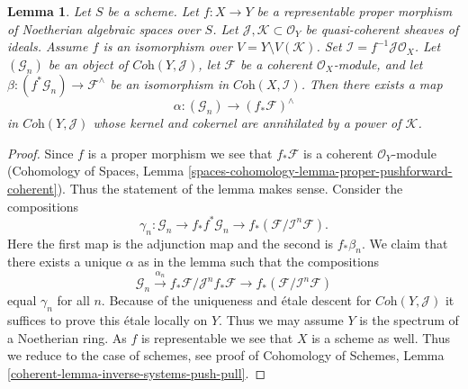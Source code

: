 \documentclass[10pt,a4paper]{amsart}
\theoremstyle{plain}
\newtheorem{lemma}[subsection]{Lemma}
\theoremstyle{definition}
\theoremstyle{remark}
\numberwithin{equation}{subsection}
\begin{document}
\begin{lemma}
\label{lemma-inverse-systems-push-pull}
Let $S$ be a scheme. Let $f : X \to Y$ be a representable
proper morphism of Noetherian algebraic spaces over $S$. Let
$\mathcal{J}, \mathcal{K} \subset \mathcal{O}_Y$
be quasi-coherent sheaves of ideals.
Assume $f$ is an isomorphism over $V = Y \setminus V(\mathcal{K})$.
Set $\mathcal{I} = f^{-1}\mathcal{J} \mathcal{O}_X$.
Let $(\mathcal{G}_n)$ be an object of $\textit{Coh}(Y, \mathcal{J})$,
let $\mathcal{F}$ be a coherent $\mathcal{O}_X$-module, and let
$\beta : (f^*\mathcal{G}_n)  \to \mathcal{F}^\wedge$ be an isomorphism in
$\textit{Coh}(X, \mathcal{I})$. Then there exists a map
$$
\alpha :
(\mathcal{G}_n)
\longrightarrow
(f_*\mathcal{F})^\wedge
$$
in $\textit{Coh}(Y, \mathcal{J})$ whose kernel and cokernel
are annihilated by a power of $\mathcal{K}$.
\end{lemma}

\begin{proof}
Since $f$ is a proper morphism we see that $f_*\mathcal{F}$ is a coherent
$\mathcal{O}_Y$-module (Cohomology of Spaces, Lemma
\ref{spaces-cohomology-lemma-proper-pushforward-coherent}).
Thus the statement of the lemma makes sense. Consider the compositions
$$
\gamma_n : \mathcal{G}_n \to
f_*f^*\mathcal{G}_n \to
f_*(\mathcal{F}/\mathcal{I}^n\mathcal{F}).
$$
Here the first map is the adjunction map and the second is $f_*\beta_n$.
We claim that there exists a unique $\alpha$ as in the lemma
such that the compositions
$$
\mathcal{G}_n \xrightarrow{\alpha_n}
f_*\mathcal{F}/\mathcal{J}^nf_*\mathcal{F} \to
f_*(\mathcal{F}/\mathcal{I}^n\mathcal{F})
$$
equal $\gamma_n$ for all $n$. Because of the uniqueness and \'etale
descent for $\textit{Coh}(Y, \mathcal{J})$ it suffices
to prove this \'etale locally on $Y$. Thus we may assume $Y$
is the spectrum of a Noetherian ring. As $f$ is representable
we see that $X$ is a scheme as well. Thus we reduce to the case of
schemes, see proof of
Cohomology of Schemes, Lemma \ref{coherent-lemma-inverse-systems-push-pull}.
\end{proof}
\end{document}
